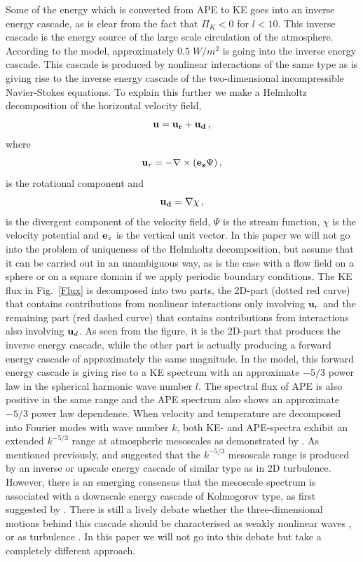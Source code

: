 Some of the energy which is converted from APE to KE goes into an inverse energy cascade, as is clear from the fact that $ \Pi_K < 0 $ for $ l < 10 $. This inverse cascade is the energy source of the large scale circulation of the atmosphere. According to the model, approximately $ 0.5 \; W/m^2 $ is going into the inverse energy cascade. This cascade is produced by nonlinear interactions of the same type as is giving rise to the inverse energy cascade of the two-dimensional incompressible Navier-Stokes equations. To explain this further we make a Helmholtz decomposition of the horizontal velocity field,
\begin{equation} 
{\bf u} = \bf{u}_r + \bf{u}_d \, ,
\end{equation} 
where
\begin{equation}  {\bf u}_r  = -\nabla \times ( {\bf e_z} \Psi) \, , \end{equation}  
is the rotational component and
\begin{equation}  \bf {u}_d = \nabla \chi  \, , \end{equation}
is the divergent component of the velocity field,  $ \Psi  $ is the stream function,  $ \chi $ is the velocity potential and $ {\bf e}_z $ is the vertical unit vector.  In this paper we will not go into the problem of uniqueness of the Helmholtz decomposition, but assume that it can be carried out in an unambiguous way, as is the case  with a flow field on a sphere or on a square domain if we apply periodic boundary conditions.  The KE flux in Fig.~\ref{Flux} is decomposed into two parts,  the 2D-part (dotted red curve) that contains contributions from nonlinear interactions only involving $ {\bf u}_r $ and the remaining part (red dashed curve) that contains contributions from interactions also involving $ {\bf u}_d $. As seen from the figure, it is the 2D-part that produces the inverse energy cascade, while the other part is actually producing a forward energy cascade of approximately the same magnitude. 
In the model, this forward energy cascade is giving rise to a KE spectrum with an approximate  $ -5/3 $ power law in the spherical harmonic wave number $ l $.    The spectral flux of APE is also positive in the same range and the APE spectrum also shows an approximate  $-5/3 $ power law dependence. When velocity and temperature are decomposed into Fourier modes with wave number $ k $, both KE- and APE-spectra exhibit an extended $ k^{-5/3} $ range at atmospheric mesoscales as  demonstrated by \citet{Nastrom-Gage:1985}.  As mentioned previously, \citet{Gage:1979} and \citet{Lilly:1983}    suggested that the $ k^{-5/3} $ mesoscale range is produced by an inverse or upscale energy cascade of similar type as in 2D turbulence. However, there is an emerging consensus that the mesoscale spectrum is associated with a downscale energy cascade of Kolmogorov type, as first suggested by \citet{Dewan:1979}. There is still a lively debate whether the three-dimensional motions behind this cascade should be characterised as weakly nonlinear waves \citep{Callies-Ferrari-Buhler:2014, Waite-Snyder:2013}, or as turbulence \citep{Lindborg:2015}. In this paper we will not go into this debate but take a completely different approach. 



